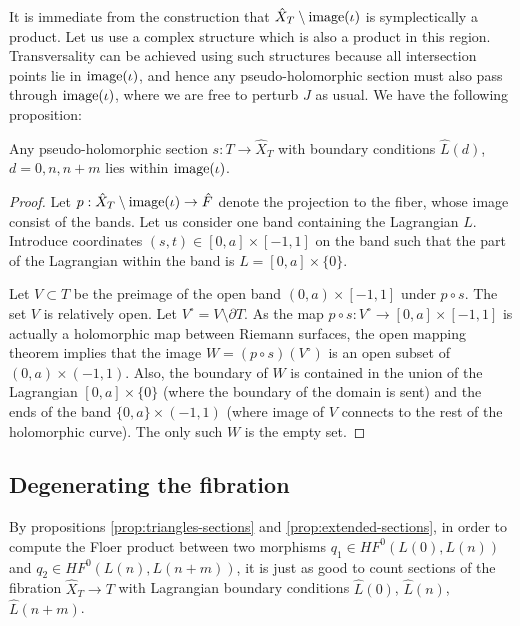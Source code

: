 \documentclass[12pt]{amsart}
\begin{document}
It is immediate from the construction that $\hat{X}_T \setminus \operatorname{image}
(\iota)$ is symplectically a product. Let us use a complex structure
which is also a product in this region. Transversality can be achieved
using such structures because all intersection points lie in $\operatorname{image}
(\iota)$, and hence any pseudo-holomorphic section must also pass
through $\operatorname{image} (\iota)$, where we are free to perturb $J$ as usual. We
have the following proposition:

\begin{proposition}
\label{prop:extended-sections}
  Any pseudo-holomorphic section $s:T \to \hat{X}_T$ with boundary
  conditions $\hat{L}(d)$, $d = 0, n, n+m$ lies within $\operatorname{image}
  (\iota)$.
\end{proposition}

\begin{proof}
  Let $p: \hat{X}_T \setminus \operatorname{image}(\iota) \to \hat{F}$ denote the
  projection to the fiber, whose image consist of the bands. Let us
  consider one band containing the Lagrangian $L$. Introduce
  coordinates $(s,t) \in [0,a]\times [-1,1]$ on the band such that the
  part of the Lagrangian within the band is $L = [0,a]\times \{0\}$.
  
  Let $V \subset T$ be the preimage of the open band $(0,a)\times
  [-1,1]$ under $p \circ s$. The set $V$ is relatively open. Let
  $V^\circ = V \setminus \partial T$. As the map $p\circ s :V^\circ
  \to [0,a]\times[-1,1]$ is actually a holomorphic map between Riemann
  surfaces, the open mapping theorem implies that the image $W =
  (p\circ s)(V^\circ)$ is an open subset of $(0,a)\times
  (-1,1)$. Also, the boundary of $W$ is contained in the union of the
  Lagrangian $[0,a]\times \{0\}$ (where the boundary of the domain is
  sent) and the ends of the band $\{0,a\}\times (-1,1)$ (where
  image of $V$ connects to the rest of the holomorphic
  curve). The only such $W$ is the empty set.
\end{proof}

\subsection{Degenerating the fibration}
\label{sec:degenerated-spaces}

By propositions \ref{prop:triangles-sections} and
\ref{prop:extended-sections}, in order to compute the Floer product
between two morphisms $q_1 \in HF^0(L(0),L(n))$ and $q_2 \in
HF^0(L(n),L(n+m))$, it is just as good to count sections of the
fibration $\hat{X}_T \to T$ with Lagrangian boundary conditions
$\hat{L}(0)$, $\hat{L}(n)$, $\hat{L}(n+m)$.
\end{document}
